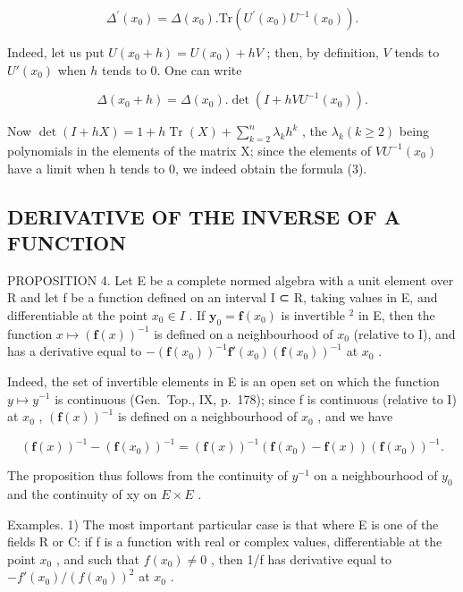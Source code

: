 \[
\varDelta^ {\prime} (x _ {0}) = \varDelta (x _ {0}). \mathrm{Tr} (U ^ {\prime} (x _ {0}) U ^ {- 1} (x _ {0})).\tag{3}
\]

Indeed, let us put \(U(x_0 + h) = U(x_0) + hV\) ; then, by definition, \(V\) tends to \(U'(x_0)\) when \(h\) tends to 0. One can write

\[
\Delta (x _ {0} + h) = \Delta (x _ {0}). \det (I + h V U ^ {- 1} (x _ {0})).
\]

Now \(\det(I + hX) = 1 + h\operatorname{Tr}(X) + \sum_{k=2}^{n} \lambda_k h^k\) , the \(\lambda_k (k \geqslant 2)\) being polynomials in the elements of the matrix X; since the elements of \(VU^{-1}(x_0)\) have a limit when h tends to 0, we indeed obtain the formula (3).

\subsection{DERIVATIVE OF THE INVERSE OF A FUNCTION}

PROPOSITION 4. Let E be a complete normed algebra with a unit element over R and let f be a function defined on an interval I ⊂ R, taking values in E, and differentiable at the point \(x_{0} \in I\) . If \(\mathbf{y}_{0} = \mathbf{f}(x_{0})\) is invertible \(^{2}\) in E, then the function \(x \mapsto (\mathbf{f}(x))^{-1}\) is defined on a neighbourhood of \(x_{0}\) (relative to I), and has a derivative equal to \(-\left(\mathbf{f}(x_{0})\right)^{-1}\mathbf{f}'(x_{0})\left(\mathbf{f}(x_{0})\right)^{-1}\) at \(x_{0}\) .

Indeed, the set of invertible elements in E is an open set on which the function \(y \mapsto y^{-1}\) is continuous (Gen.~Top., IX, p.~178); since f is continuous (relative to I) at \(x_{0}\) , \(\left(\mathbf{f}(x)\right)^{-1}\) is defined on a neighbourhood of \(x_{0}\) , and we have

\[
\left(\mathbf {f} (x)\right) ^ {- 1} - \left(\mathbf {f} \left(x _ {0}\right)\right) ^ {- 1} = \left(\mathbf {f} (x)\right) ^ {- 1} \left(\mathbf {f} \left(x _ {0}\right) - \mathbf {f} (x)\right) \left(\mathbf {f} \left(x _ {0}\right)\right) ^ {- 1}.
\]

The proposition thus follows from the continuity of \(y^{-1}\) on a neighbourhood of \(y_{0}\) and the continuity of xy on \(E \times E\) .

Examples. 1) The most important particular case is that where E is one of the fields R or C: if f is a function with real or complex values, differentiable at the point \(x_{0}\) , and such that \(f(x_{0}) \neq 0\) , then 1/f has derivative equal to \(-f'(x_{0})/(f(x_{0}))^{2}\) at \(x_{0}\) .

